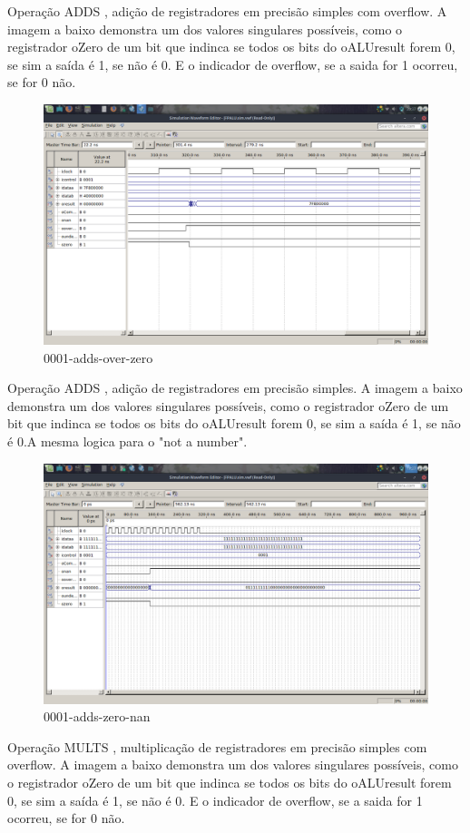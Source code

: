 \documentclass[12pt]{article}
\begin{document}
Operação ADDS , adição de registradores em precisão simples com overflow.
A imagem a baixo demonstra um dos valores singulares possíveis, como o registrador oZero de um bit que indinca se todos os bits do oALUresult forem 0, se sim a saída é 1, se não é 0. E o indicador de overflow, se a saida for 1 ocorreu, se for 0 não.
\begin{figure}[H]
	\centering
	\includegraphics[width=.8\textwidth]{imagens2/0001-adds-over-zero.png}
	\caption{0001-adds-over-zero}
	\label{fig:0001-adds-over-zero}
\end{figure}
Operação ADDS , adição de registradores em precisão simples.
A imagem a baixo demonstra um dos valores singulares possíveis, como o registrador oZero de um bit que indinca se todos os bits do oALUresult forem 0, se sim a saída é 1, se não é 0.A mesma logica para o "not a number".
\begin{figure}[H]
	\centering
	\includegraphics[width=.8\textwidth]{imagens2/0001-adds-zero-nan.png}
	\caption{0001-adds-zero-nan}
	\label{fig:0001-adds-zero-nan}
\end{figure}
Operação MULTS , multiplicação de registradores em precisão simples com overflow.
A imagem a baixo demonstra um dos valores singulares possíveis, como o registrador oZero de um bit que indinca se todos os bits do oALUresult forem 0, se sim a saída é 1, se não é 0. E o indicador de overflow, se a saida for 1 ocorreu, se for 0 não.
\end{document}
